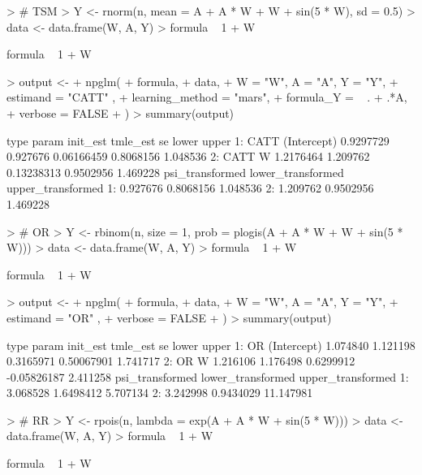 \documentclass{article}
\begin{document}
\begin{Schunk}
\begin{Sinput}
> # TSM
> Y <- rnorm(n, mean = A + A * W + W + sin(5 * W), sd = 0.5)
> data <- data.frame(W, A, Y)
> formula ~ 1 + W
\end{Sinput}
\begin{Soutput}
formula ~ 1 + W
\end{Soutput}
\begin{Sinput}
> output <-
+   npglm(
+     formula,
+     data,
+     W = "W", A = "A", Y = "Y",
+     estimand = "CATT" ,
+     learning_method = "mars",
+     formula_Y = ~ . + .*A,
+     verbose = FALSE
+   )
> summary(output)
\end{Sinput}
\begin{Soutput}
   type       param  init_est tmle_est         se     lower    upper
1: CATT (Intercept) 0.9297729 0.927676 0.06166459 0.8068156 1.048536
2: CATT           W 1.2176464 1.209762 0.13238313 0.9502956 1.469228
   psi_transformed lower_transformed upper_transformed
1:        0.927676         0.8068156          1.048536
2:        1.209762         0.9502956          1.469228
\end{Soutput}
\begin{Sinput}
> # OR
> Y <- rbinom(n, size =  1, prob = plogis(A + A * W + W + sin(5 * W)))
> data <- data.frame(W, A, Y)
> formula ~ 1 + W
\end{Sinput}
\begin{Soutput}
formula ~ 1 + W
\end{Soutput}
\begin{Sinput}
> output <-
+   npglm(
+     formula,
+     data,
+     W = "W", A = "A", Y = "Y",
+     estimand = "OR" ,
+     verbose = FALSE
+   )
> summary(output)
\end{Sinput}
\begin{Soutput}
   type       param init_est tmle_est        se       lower    upper
1:   OR (Intercept) 1.074840 1.121198 0.3165971  0.50067901 1.741717
2:   OR           W 1.216106 1.176498 0.6299912 -0.05826187 2.411258
   psi_transformed lower_transformed upper_transformed
1:        3.068528         1.6498412          5.707134
2:        3.242998         0.9434029         11.147981
\end{Soutput}
\begin{Sinput}
> # RR
> Y <- rpois(n, lambda = exp(A + A * W + sin(5 * W)))
> data <- data.frame(W, A, Y)
> formula ~ 1 + W
\end{Sinput}
\begin{Soutput}
formula ~ 1 + W
\end{Soutput}
\begin{Sinput}

\end{Sinput}
\end{Schunk}
\end{document}
